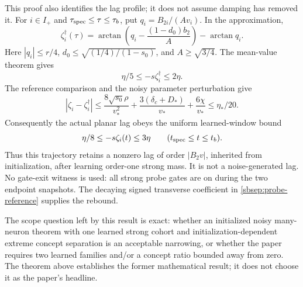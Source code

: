 \documentclass[11pt]{article}
\theoremstyle{remark}
\begin{document}
This proof also identifies the lag profile; it does not assume damping
has removed it. For $i\in I_+$ and $\tau_{\rm spec}\le\tau\le\tau_b$,
put $q_i=B_{2i}/(Av_i)$. In the approximation,
\begin{equation}\label{sbsep:lag-profile}
 \zeta_i^\dagger(\tau)=
 \arctan\left(q_i-\frac{(1-d_0)b_2}{A}\right)-\arctan q_i.
\end{equation}
Here $|q_i|\le r/4$, $d_0\le\sqrt{(1/4)/(1-s_0)}$, and
$A\ge\sqrt{3/4}$. The mean-value theorem gives
\[
 \eta/5\le-s\zeta_i^\dagger\le2\eta.
\]
The reference comparison and the noisy parameter perturbation give
\[
 |\zeta_i-\zeta_i^\dagger|
 \le\frac{8\sqrt{s_0}\rho}{v_*^2}
       +\frac{3(\delta_c+D_*)}{v_*}+\frac{6\chi}{v_*}
 \le\eta_*/20.
\]
Consequently the actual planar lag obeys the uniform learned-window bound
\begin{equation}\label{sbsep:lag-lower}
 \eta/8\le-s\zeta_i(t)\le3\eta
 \qquad(t_{\rm spec}\le t\le t_b).
\end{equation}
Thus this trajectory retains a nonzero lag of order $|B_2v|$, inherited
from initialization, after learning order-one strong mass. It is not a
noise-generated lag. No gate-exit witness is used: all strong probe gates
are on during the two endpoint snapshots. The decaying signed transverse
coefficient in \eqref{sbsep:probe-reference} supplies the rebound.

The scope question left by this result is exact: whether an initialized
noisy many-neuron theorem with one learned strong cohort and
initialization-dependent extreme concept separation is an acceptable
narrowing, or whether the paper requires two learned families and/or a
concept ratio bounded away from zero. The theorem above establishes the
former mathematical result; it does not choose it as the paper's headline.
\end{document}
